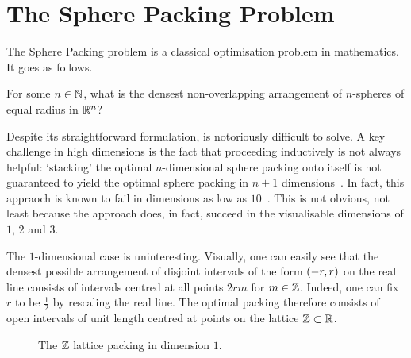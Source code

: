 \section{The Sphere Packing Problem}\label{Ch1:Sec:1_1_Sphere_Packing}

The Sphere Packing problem is a classical optimisation problem in mathematics. It goes as follows.

\begin{boxproblem}\label{Ch1:Prob:SpherePacking_n}
    For some $n \in \mathbb{N}$, what is the densest non-overlapping arrangement of $n$-spheres of equal radius in $\mathbb{R}^n$?
\end{boxproblem}

Despite its straightforward formulation,  is notoriously difficult to solve. A key challenge in high dimensions is the fact that proceeding inductively is not always helpful: `stacking' the optimal $n$-dimensional sphere packing onto itself is not guaranteed to yield the optimal sphere packing in $n + 1$ dimensions~\cite{CohnOnViazovskaICM}. In fact, this appraoch is known to fail in dimensions as low as $10$~\cite{CohnOnViazovskaAMS}. This is not obvious, not least because the approach does, in fact, succeed in the visualisable dimensions of $1$, $2$ and $3$.

The $1$-dimensional case is uninteresting. Visually, one can easily see that the densest possible arrangement of disjoint intervals of the form $\left( -r, r \right)$ on the real line consists of intervals centred at all points $2rm$ for $m \in \mathbb{Z}$. Indeed, one can fix $r$ to be $\frac{1}{2}$ by rescaling the real line. The optimal packing therefore consists of open intervals of unit length centred at points on the lattice $\mathbb{Z} \subset \mathbb{R}$.

\begin{figure}[htb]
    \centering
    \caption{The $\mathbb{Z}$ lattice packing in dimension $1$.}
    \label{Ch1:Fig:Z_Lattice_Packing_1D}
\end{figure}

